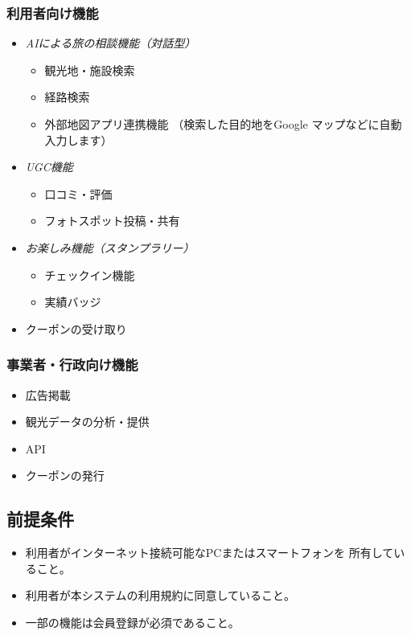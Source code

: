 \documentclass{docs}
\begin{document}
\subsubsection{利用者向け機能}
\begin{itemize}
	\item \emph{AIによる旅の相談機能（対話型）}
	\begin{itemize}
		\item 観光地・施設検索
		\item 経路検索
		\item 外部地図アプリ連携機能
		（検索した目的地をGoogle マップなどに自動入力します）
	\end{itemize}
	\item \emph{UGC機能}
	\begin{itemize}
		\item 口コミ・評価
		\item フォトスポット投稿・共有
	\end{itemize}
	\item \emph{お楽しみ機能（スタンプラリー）}
	\begin{itemize}
		\item チェックイン機能
		\item 実績バッジ
	\end{itemize}
	\item クーポンの受け取り
\end{itemize}

\subsubsection{事業者・行政向け機能}
\begin{itemize}
	\item 広告掲載
	\item 観光データの分析・提供
	\item API
	\item クーポンの発行
\end{itemize}

\subsection{前提条件}
\begin{itemize}
	\item 利用者がインターネット接続可能なPCまたはスマートフォンを
	所有していること。
	\item 利用者が本システムの利用規約に同意していること。
	\item 一部の機能は会員登録が必須であること。
\end{itemize}
\end{document}
